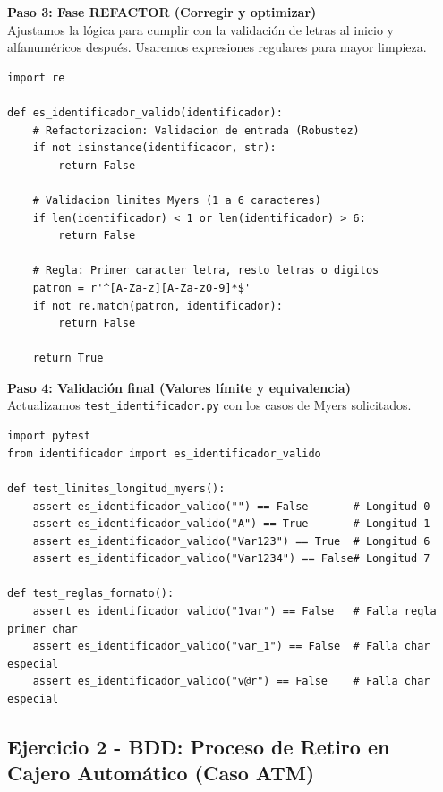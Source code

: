 \documentclass{article}
\begin{document}
\textbf{Paso 3: Fase REFACTOR (Corregir y optimizar)} \\
Ajustamos la lógica para cumplir con la validación de letras al inicio y alfanuméricos después. Usaremos expresiones regulares para mayor limpieza.
\begin{lstlisting}[caption={lab2/identificador.py (Fase REFACTOR final)}]
import re

def es_identificador_valido(identificador):
    # Refactorizacion: Validacion de entrada (Robustez)
    if not isinstance(identificador, str):
        return False
        
    # Validacion limites Myers (1 a 6 caracteres)
    if len(identificador) < 1 or len(identificador) > 6:
        return False
        
    # Regla: Primer caracter letra, resto letras o digitos
    patron = r'^[A-Za-z][A-Za-z0-9]*$'
    if not re.match(patron, identificador):
        return False
        
    return True
\end{lstlisting}

\textbf{Paso 4: Validación final (Valores límite y equivalencia)} \\
Actualizamos \texttt{test\_identificador.py} con los casos de Myers solicitados.
\begin{lstlisting}[caption={lab2/test\_identificador.py (Validación Final)}]
import pytest
from identificador import es_identificador_valido

def test_limites_longitud_myers():
    assert es_identificador_valido("") == False       # Longitud 0
    assert es_identificador_valido("A") == True       # Longitud 1
    assert es_identificador_valido("Var123") == True  # Longitud 6
    assert es_identificador_valido("Var1234") == False# Longitud 7

def test_reglas_formato():
    assert es_identificador_valido("1var") == False   # Falla regla primer char
    assert es_identificador_valido("var_1") == False  # Falla char especial
    assert es_identificador_valido("v@r") == False    # Falla char especial
\end{lstlisting}

\subsection{Ejercicio 2 - BDD: Proceso de Retiro en Cajero Automático (Caso ATM)}
\end{document}

